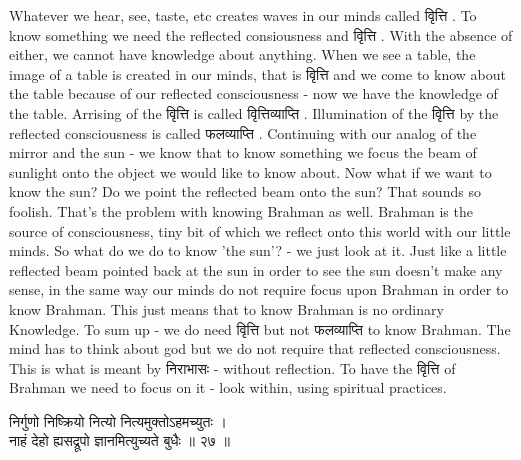 \documentclass{article}
\begin{document}
{\begin{oframed}
    Whatever we hear, see, taste, etc creates waves in our minds called
    \texthindi{वृित्ति}
    . To know something we need the reflected consiousness and
    \texthindi{वृित्ति}
    . With the absence of either, we cannot have knowledge about anything. When
    we see a table, the image of a table is created in our minds, that is
    \texthindi{वृित्ति}
    and we come to know about the table because of our reflected consciousness
    - now we have the knowledge of the table.
    Arrising of the
    \texthindi{वृित्ति}
    is called
    \texthindi{विृत्तिव्याप्ति}
    . Illumination of the
    \texthindi{वृित्ति}
    by the reflected consciousness is called
    \texthindi{फलव्याप्ति}
    . Continuing with our analog of the mirror and the sun - we know that to
    know something we focus the beam of sunlight onto the object we would like
    to know about. Now what if we want to know the sun? Do we point the
    reflected beam onto the sun? That sounds so foolish. That's the problem
    with knowing Brahman as well. Brahman is the source of consciousness, tiny
    bit of which we reflect onto this world with our little minds.
    So what do we do to know 'the sun'? -  we just look at it. Just like a
    little reflected beam pointed back at the sun in order to see the sun
    doesn't make any sense, in the same way our minds do not require focus
    upon Brahman in order to know Brahman. This just means that to know
    Brahman is no ordinary Knowledge. To sum up - we do need
    \texthindi{वृित्ति}
    but not
    \texthindi{फलव्याप्ति}
    to know Brahman. The mind has to think about god but we do not require that
    reflected consciousness. This is what is meant by
    \texthindi{निराभासः}
    - without reflection.
    To have the
    \texthindi{वृित्ति}
    of Brahman we need to focus on it - look within, using spiritual practices.

\end{oframed}

\begin{large}
\begin{center}
    \begin{hindi}

    निर्गुणो निष्क्रियो नित्यो नित्यमुक्तोऽहमच्युतः ।\\
    नाहं देहो ह्यसद्रूपो ज्ञानमित्युच्यते बुधैः ॥ २७ ॥

    \end{hindi}
\end{center}
\end{large}

}
\end{document}
